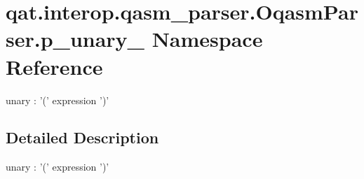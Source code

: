 \hypertarget{namespaceqat_1_1interop_1_1qasm__parser_1_1OqasmParser_1_1p__unary__4}{\section{qat.\-interop.\-qasm\-\_\-parser.\-Oqasm\-Parser.\-p\-\_\-unary\-\_ Namespace Reference}
\label{namespaceqat_1_1interop_1_1qasm__parser_1_1OqasmParser_1_1p__unary__4}
}


unary \-: '(' expression ')'  




\subsection{Detailed Description}
unary \-: '(' expression ')' 